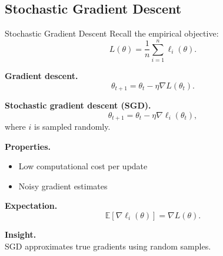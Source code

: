 \documentclass[aspectratio=169,11pt]{beamer}
\begin{document}
\subsection{Stochastic Gradient Descent}
\begin{frame}[t,allowframebreaks]{Stochastic Gradient Descent}
\small
Recall the empirical objective:
\[
L(\theta) = \frac{1}{n} \sum_{i=1}^n \ell_i(\theta).
\]

\textbf{Gradient descent.}\\ \[
\theta_{t+1} = \theta_t - \eta \nabla L(\theta_t).
\]

\textbf{Stochastic gradient descent (SGD).}\\ \[
\theta_{t+1} = \theta_t - \eta \nabla \ell_i(\theta_t),
\]
where $i$ is sampled randomly.

\textbf{Properties.}\\ \begin{itemize}
    \item Low computational cost per update
    \item Noisy gradient estimates
\end{itemize}

\textbf{Expectation.}\\ \[
\mathbb{E}[\nabla \ell_i(\theta)] = \nabla L(\theta).
\]

\textbf{Insight.}\\ SGD approximates true gradients using random samples.
\end{frame}
\end{document}
